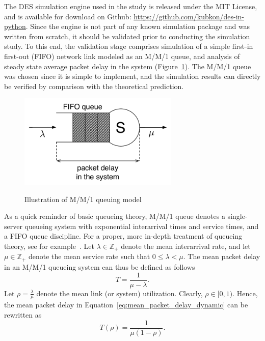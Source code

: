 The DES simulation engine used in the study is released under the MIT License, and is available for download on Github: \url{https://github.com/kubkon/des-in-python}. Since the engine is not part of any known simulation package and was written from scratch, it should be validated prior to conducting the simulation study. To this end, the validation stage comprises simulation of a simple first-in first-out (FIFO) network link modeled as an M/M/1 queue, and analysis of steady state average packet delay in the system (Figure~\ref{fig:mm1_queue_dynamic}). The M/M/1 queue was chosen since it is simple to implement, and the simulation results can directly be verified by comparison with the theoretical prediction.

\begin{figure}[h]
	\caption{Illustration of M/M/1 queuing model}
	\includegraphics[width=3in]{3/Figures/mm1_queue}
	\label{fig:mm1_queue_dynamic}
\end{figure}

As a quick reminder of basic queueing theory, M/M/1 queue denotes a single-server queueing system with exponential interarrival times and service times, and a FIFO queue discipline. For a proper, more in-depth treatment of queueing theory, see for example~\cite{CassandrasLafortune2008}. Let $\lambda\in\mathbb{Z}_+$ denote the mean interarrival rate, and let $\mu\in\mathbb{Z}_+$ denote the mean service rate such that $0 \le \lambda < \mu$. The mean packet delay in an M/M/1 queueing system can thus be defined as follows
\begin{equation}
	\label{eq:mean_packet_delay_dynamic}
	T = \frac{1}{\mu - \lambda}.
\end{equation}
Let $\rho = \displaystyle\frac{\lambda}{\mu}$ denote the mean link (or system) utilization. Clearly, $\rho\in [0,1)$. Hence, the mean packet delay in Equation~\eqref{eq:mean_packet_delay_dynamic} can be rewritten as
\begin{equation}
	\label{eq:mean_packet_delay_2_dynamic}
	T(\rho) = \frac{1}{\mu(1 - \rho)}.
\end{equation}

